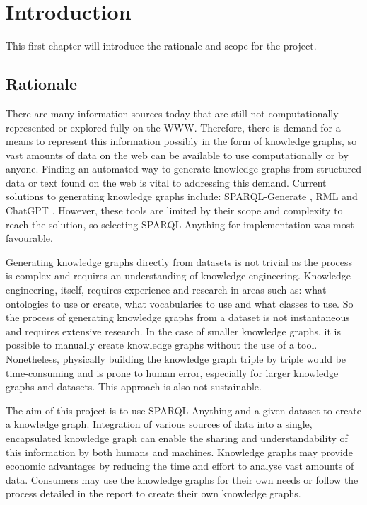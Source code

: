 \chapter{Introduction}
This first chapter will introduce the rationale and scope for the project.

\section{Rationale}
There are many information sources today that are still not computationally represented or explored fully on the WWW. Therefore, there is demand for a means to represent this information possibly in the form of knowledge graphs, so vast amounts of data on the web can be available to use computationally or by anyone. Finding an automated way to generate knowledge graphs from structured data or text found on the web is vital to addressing this demand. Current solutions to generating knowledge graphs include: SPARQL-Generate \cite{sparqlgenerate}, RML \cite{rml} and ChatGPT \cite{chatgptwebsite}. However, these tools are limited by their scope and complexity to reach the solution, so selecting SPARQL-Anything \cite{sparqlanythinggithub} for implementation was most favourable. 

Generating knowledge graphs directly from datasets is not trivial as the process is complex and requires an understanding of knowledge engineering. Knowledge engineering, itself, requires experience and research in areas such as: what ontologies to use or create, what vocabularies to use and what classes to use. So the process of generating knowledge graphs from a dataset is not instantaneous and requires extensive research. In the case of smaller knowledge graphs, it is possible to manually create knowledge graphs without the use of a tool. Nonetheless, physically building the knowledge graph triple by triple would be time-consuming and is prone to human error, especially for larger knowledge graphs and datasets. This approach is also not sustainable. 

The aim of this project is to use SPARQL Anything and a given dataset to create a knowledge graph. Integration of various sources of data into a single, encapsulated knowledge graph can enable the sharing and understandability of this information by both humans and machines. Knowledge graphs may provide economic advantages by reducing the time and effort to analyse vast amounts of data. Consumers may use the knowledge graphs for their own needs or follow the process detailed in the report to create their own knowledge graphs.

